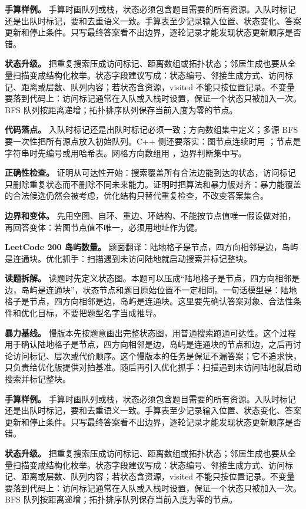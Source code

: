 \textbf{手算样例。} 手算时画队列或栈，状态必须包含题目需要的所有资源。入队时标记还是出队时标记，要和去重语义一致。手算表至少记录输入位置、状态变化、答案更新和停止条件。只写最终答案看不出边界，逐轮记录才能发现状态更新顺序是否错。

\textbf{状态升级。} 把重复搜索压成访问标记、距离数组或拓扑状态；邻居生成也要从全量扫描变成结构化枚举。状态字段建议写成：状态编号、邻接生成方式、访问标记、距离或层数、队列内容；若状态含资源，visited 不能只按位置记录。不变量要落到代码上：访问标记通常在入队或入栈时设置，保证一个状态只被加入一次。BFS 队列按距离递增；拓扑排序队列保存当前入度为零的节点。

\textbf{代码落点。} 入队时标记还是出队时标记必须一致；方向数组集中定义；多源 BFS 要一次性把所有源点放入初始队列。C++ 侧还要落实：图节点连续时用 ；节点是字符串时先编号或用哈希表。网格方向数组用 ，边界判断集中写。

\textbf{正确性检查。} 证明从可达性开始：搜索覆盖所有合法边能到达的状态，访问标记只删除重复状态而不删除不同未来能力。证明时把算法和暴力版对齐：暴力能覆盖的合法候选仍然会被考虑，优化结构只替代重复检查，不改变答案集合。

\textbf{边界和变体。} 先用空图、自环、重边、环结构、不能按节点值唯一假设做对拍，再回答变体：若图节点值不唯一，必须用地址作为键。

\noindent\textbf{LeetCode 200 岛屿数量。} 题面翻译：陆地格子是节点，四方向相邻是边，岛屿是连通块。优化抓手：扫描遇到未访问陆地就启动搜索并标记整块。

\textbf{读题拆解。} 读题时先定义状态图。本题可以压成“陆地格子是节点，四方向相邻是边，岛屿是连通块”，状态节点和题目原始位置不一定相同。一句话模型是：陆地格子是节点，四方向相邻是边，岛屿是连通块。这里要先确认答案对象、合法性条件和优化目标，不要把题型名字当成推导。

\textbf{暴力基线。} 慢版本先按题意画出完整状态图，用普通搜索跑通可达性。这个过程用于确认陆地格子是节点，四方向相邻是边，岛屿是连通块的节点和边，之后再讨论访问标记、层次或代价顺序。这个慢版本的任务是保证不漏答案；它不追求快，只负责给优化版提供对拍基准。随后再引入优化抓手：扫描遇到未访问陆地就启动搜索并标记整块。

\textbf{手算样例。} 手算时画队列或栈，状态必须包含题目需要的所有资源。入队时标记还是出队时标记，要和去重语义一致。手算表至少记录输入位置、状态变化、答案更新和停止条件。只写最终答案看不出边界，逐轮记录才能发现状态更新顺序是否错。

\textbf{状态升级。} 把重复搜索压成访问标记、距离数组或拓扑状态；邻居生成也要从全量扫描变成结构化枚举。状态字段建议写成：状态编号、邻接生成方式、访问标记、距离或层数、队列内容；若状态含资源，visited 不能只按位置记录。不变量要落到代码上：访问标记通常在入队或入栈时设置，保证一个状态只被加入一次。BFS 队列按距离递增；拓扑排序队列保存当前入度为零的节点。

